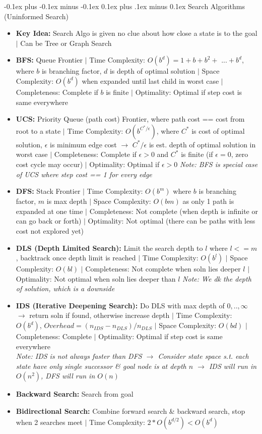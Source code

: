 \documentclass[landscape]{article}
\makeatletter
\renewcommand{\subsection}{\@startsection{subsection}{2}{0mm}%
  {-0.1ex plus -0.1ex minus -0.1ex}%
  {0.1ex plus .1ex minus 0.1ex}%
{\normalfont\scriptsize\bfseries}}
\makeatother
\begin{document}
\begin{multicols*}{5}
    \subsection{Search Algorithms (Uninformed Search)}
    \begin{itemize}
      \item \textbf{Key Idea:} Search Algo is given no clue about how close a state is to the goal $\vert$ Can be Tree or Graph Search
      \item \textbf{BFS:} Queue Frontier $\vert$ Time Complexity: $O(b^d) = 1 + b + b^2 +$ $... + b^d$, where $b$ is branching factor, $d$ is depth of optimal solution $\vert$ Space Complexity: $O(b^d)$ when expanded until last child in worst case $\vert$ Completeness: Complete if $b$ is finite $\vert$ Optimality: Optimal if step cost is same everywhere
      \item \textbf{UCS:} Priority Queue (path cost) Frontier, where path cost == cost from root to a state $\vert$ Time Complexity: $O(b^{C^*/\epsilon})$, where $C^*$ is cost of optimal solution, $\epsilon$ is minimum edge cost $\rightarrow$ $C^*/\epsilon$ is est. depth of optimal solution in worst case $\vert$ Completeness: Complete if $\epsilon > 0$ and $C^*$ is finite (if $\epsilon = 0$, zero cost cycle may occur) $\vert$ Optimality: Optimal if $\epsilon > 0$
      \textit{Note: BFS is special case of UCS where step cost == 1 for every edge}
      \item \textbf{DFS:} Stack Frontier $\vert$ Time Complexity: $O(b^m)$ where $b$ is branching factor, $m$ is max depth $\vert$ Space Complexity: $O(bm)$ as only 1 path is expanded at one time $\vert$ Completeness: Not complete (when depth is infinite or can go back or forth) $\vert$ Optimality: Not optimal (there can be paths with less cost not explored yet)
      \item \textbf{DLS (Depth Limited Search):} Limit the search depth to $l$ where $l<=m$, backtrack once depth limit is reached $\vert$ Time Complexity: $O(b^l)$ $\vert$ Space Complexity: $O(bl)$ $\vert$ Completeness: Not complete when soln lies deeper $l$ $\vert$ Optimality: Not optimal when soln lies deeper than $l$
      \textit{Note: We dk the depth of solution, which is a downside}
      \item \textbf{IDS (Iterative Deepening Search):} Do DLS with max depth of $0,..,\infty$ $\rightarrow$ return soln if found, otherwise increase depth $\vert$ Time Complexity: $O(b^d)$, $Overhead=(n_{IDS} - n_{DLS})/n_{DLS}$ $\vert$ Space Complexity: $O(bd)$ $\vert$ Completeness: Complete $\vert$ Optimality: Optimal if step cost is same everywhere \\
      \textit{Note: IDS is not always faster than DFS $\rightarrow$ Consider state space s.t. each state have only single successor \& goal node is at depth $n$ $\rightarrow$ IDS will run in $O(n^2)$, DFS will run in $O(n)$}
      \item \textbf{Backward Search:} Search from goal
      \item \textbf{Bidirectional Search:} Combine forward search \& backward search, stop when 2 searches meet $\vert$ Time Complexity: $2*O(b^{d/2}) < O(b^d)$
    \end{itemize}


\end{multicols*}
\end{document}
